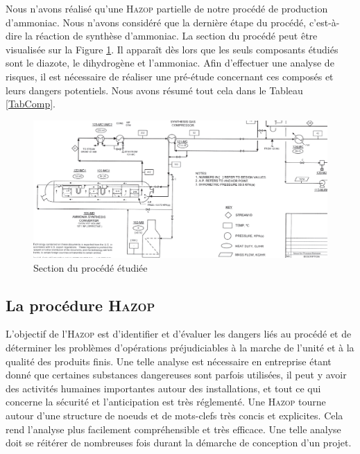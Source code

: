 Nous n'avons réalisé qu'une \textsc{Hazop} partielle de notre procédé de production d'ammoniac. Nous n'avons considéré 
que la dernière étape du procédé, c'est-à-dire la réaction de synthèse d'ammoniac. La section du procédé peut être visualisée 
sur la Figure \ref{section_procede}. Il apparaît dès lors que les seuls composants étudiés sont le diazote, le dihydrogène 
et l'ammoniac. Afin d'effectuer une analyse de risques, il est nécessaire de réaliser une pré-étude concernant ces composés 
et leurs dangers potentiels. Nous avons résumé tout cela dans le Tableau \ref{TabComp}.\cite{CSST}\cite{Ontario}

\begin{figure}[ht!]
 \centering
 \includegraphics[scale=0.3]{section_procede.PNG}
 \caption{Section du procédé étudiée}
 \label{section_procede}
\end{figure}

\subsection{La procédure \textsc{Hazop}}

L’objectif de l’\textsc{Hazop} est d’identifier et d’évaluer les dangers liés au procédé et de déterminer les problèmes 
d’opérations préjudiciables à la marche de l’unité et à la qualité des produits finis. Une telle analyse est nécessaire 
en entreprise étant donné que certaines substances dangereuses sont parfois utilisées, il peut y avoir des activités 
humaines importantes autour des installations, et tout ce qui concerne la sécurité et l'anticipation est très réglementé.
Une \textsc{Hazop} tourne autour d'une structure de noeuds et de mots-clefs très concis et explicites. Cela rend l'analyse 
plus facilement compréhensible et très efficace.
Une telle analyse doit se réitérer de nombreuses fois durant la démarche de conception d'un projet.\cite{icamp}

